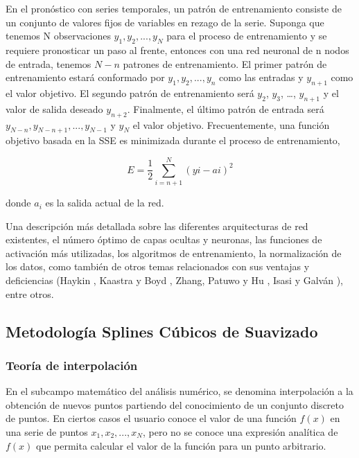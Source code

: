 \documentclass[
  12pt,
]{krantz}
\begin{document}
En el pronóstico con series temporales, un patrón de entrenamiento consiste de un conjunto de valores fijos de variables en rezago de la serie. Suponga que tenemos N observaciones \(y_{1}, y_{2}, ..., y_{N}\) para el proceso de entrenamiento y se requiere pronosticar un paso al frente, entonces con una red neuronal de n nodos de entrada, tenemos \(N-n\) patrones de entrenamiento. El primer patrón de entrenamiento estará conformado por \(y_{1}, y_{2}, ..., y_{n}\) como las entradas y \(y_{n+1}\) como el valor objetivo. El segundo patrón de entrenamiento será \(y_{2}\), \(y_{3}\), \ldots, \(y_{n+1}\) y el valor de salida deseado \(y_{n+2}\). Finalmente, el último patrón de entrada será \(y_{N-n}, y_{N-n+1}, ..., y_{N-1}\) y \(y_{N}\) el valor objetivo. Frecuentemente, una función objetivo basada en la SSE es minimizada durante el proceso de entrenamiento,

\[\displaystyle{E = \frac{1}{2} \sum_{i=n+1}^{N}(y{i}-a{i})^2 }\]

donde \(a_{i}\) es la salida actual de la red.

Una descripción más detallada sobre las diferentes arquitecturas de red existentes, el número óptimo de capas ocultas y neuronas, las funciones de activación más utilizadas, los algoritmos de entrenamiento, la normalización de los datos, como también de otros temas relacionados con sus ventajas y deficiencias (Haykin \cite{Ha}, Kaastra y Boyd \cite{KB}, Zhang, Patuwo y Hu \cite{ZPH}, Isasi y Galván \cite{IG}), entre otros.

\hypertarget{metodologia-splines-cubicos-de-suavizado}{%
\subsection{Metodología Splines Cúbicos de Suavizado}\label{metodologia-splines-cubicos-de-suavizado}}

\hypertarget{teoria-de-interpolacion}{%
\subsubsection{Teoría de interpolación}\label{teoria-de-interpolacion}}

En el subcampo matemático del análisis numérico, se denomina interpolación a la obtención de nuevos puntos partiendo del conocimiento de un conjunto discreto de puntos. En ciertos casos el usuario conoce el valor de una función \(f(x)\) en una serie de puntos \(x_{1}, x_{2},..., x_{N}\), pero no se conoce una
expresión analítica de \(f(x)\) que permita calcular el valor de la función para un punto arbitrario.
\end{document}
